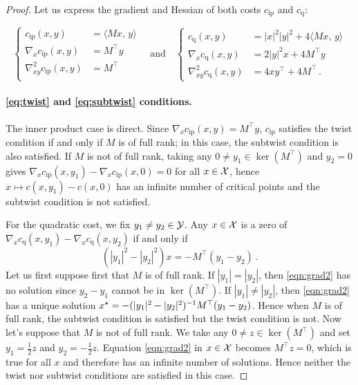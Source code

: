 \begin{proof}
Let us express the gradient and Hessian of both costs $c_{\text{ip}}$ and $c_{\text{q}}$:

$$ \left\{ \begin{aligned}
	c_{\text{ip}}(x,y) & =\langle M x,\,y\rangle\\
	\nabla_{x}c_{\text{ip}}(x,y) & = M^\top y \\
	\nabla^{2}_{xy}c_{\text{ip}}(x,y) & = M^\top \\
\end{aligned}\right.\quad \text{and}\quad \left\{\begin{aligned}
	c_{\text{q}}(x,y) & =|x|^{2}|y|^{2}+4\langle Mx,\,y\rangle\\
	\nabla_{x}c_{\text{q}}(x,y) & =2|y|^{2}x+4 M^\top y\\
	\nabla^{2}_{xy}c_{\text{q}}(x,y) & =4xy^\top+4 M^\top\,.
\end{aligned}\right.$$


\paragraph{\cref{eq:twist} and \cref{eq:subtwist} conditions.} The inner product case is direct. Since $\nabla_{x}c_{\text{ip}}(x,y) = M^\top y$, $c_{\text{ip}}$ satisfies the twist condition if and only if $M$ is of full rank; in this case, the subtwist condition is also satisfied. If $M$ is not of full rank, taking any $0\neq y_1\in \ker (M^\top)$ and $y_2=0$ gives $\nabla_x c_{\text{ip}}(x,y_1)-\nabla_x c_{\text{ip}}(x,0)=0$ for all $x\in\mathcal{X}$, hence $x\mapsto c(x,y_1)-c(x,0)$ has an infinite number of critical points and the subtwist condition is not satisfied.

For the quadratic cost, we fix $y_1\neq y_2\in\mathcal{Y}$. Any $x\in\mathcal{X}$ is a zero of $\nabla_x c_{\text{q}}(x,y_1)-\nabla_x c_{\text{q}}(x,y_2)$ if and only if
        \begin{equation}
            (|y_1|^2-|y_2|^2)x=-M^\top(y_1-y_2)\,.
            \label{eqn:grad2}
        \end{equation}
Let us first suppose first that $M$ is of full rank. If $|y_1|=|y_2|$, then \cref{eqn:grad2} has no solution since $y_2-y_1$ cannot be in $\ker(M^\top)$. If $|y_1|\neq|y_2|$, then \cref{eqn:grad2} has a unique solution $x^\star=-(|y_1|^2-|y_2|^2)^{-1}M^\top(y_1-y_2)$. Hence when $M$ is of full rank, the subtwist condition is satisfied but the twist condition is not. Now let's suppose that $M$ is not of full rank. We take any $0\neq z\in\ker(M^\top)$ and set $y_1=\frac12 z$ and $y_2=-\frac12 z$. Equation \cref{eqn:grad2} in $x\in\mathcal{X}$ becomes $M^\top z=0$, which is true for all $x$ and therefore has an infinite number of solutions. Hence neither the twist nor subtwist conditions are satisfied in this case.


\end{proof}
